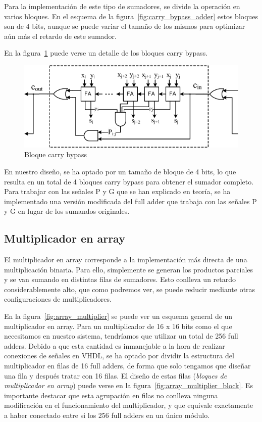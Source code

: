 \documentclass[a4paper,12pt]{article}
\begin{document}
Para la implementación de este tipo de sumadores, se divide la operación en varios bloques. En el esquema de la figura~\ref{fig:carry_bypass_adder} estos bloques son de 4 bits, aunque se puede variar el tamaño de los mismos para optimizar aún más el retardo de este sumador.

En la figura~\ref{fig:carry_skip_block} puede verse un detalle de los bloques carry bypass.

\begin{figure}[hbt]
\includegraphics[width=\textwidth]{img/carryskipblock.png} 
\caption{Bloque carry bypass} \label{fig:carry_skip_block}
\end{figure}

En nuestro diseño, se ha optado por un tamaño de bloque de 4 bits, lo que resulta en un total de 4 bloques carry bypass para obtener el sumador completo. Para trabajar con las señales P y G que se han explicado en teoría, se ha implementado una versión modificada del full adder que trabaja con las señales P y G en lugar de los sumandos originales.

\subsection{Multiplicador en array}
El multiplicador en array corresponde a la implementación más directa de una multiplicación binaria. Para ello, simplemente se generan los productos parciales y se van sumando en distintas filas de sumadores. Esto conlleva un retardo considerablemente alto, que como podremos ver, se puede reducir mediante otras configuraciones de multiplicadores.

En la figura~\ref{fig:array_multiplier} se puede ver un esquema general de un multiplicador en array. Para un multiplicador de 16 x 16 bits como el que necesitamos en nuestro sistema, tendríamos que utilizar un total de 256 full adders. Debido a que esta cantidad es inmanejable a la hora de realizar conexiones de señales en VHDL, se ha optado por dividir la estructura del multiplicador en filas de 16 full adders, de forma que solo tengamos que diseñar una fila y después tratar con 16 filas. El diseño de estas filas (\emph{bloques de multiplicador en array}) puede verse en la figura~\ref{fig:array_multiplier_block}. Es importante destacar que esta agrupación en filas no conlleva ninguna modificación en el funcionamiento del multiplicador, y que equivale exactamente a haber conectado entre si los 256 full adders en un único módulo.
\end{document}
